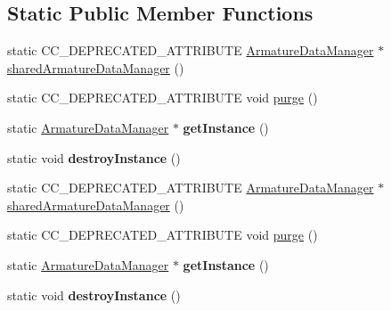 \subsection*{Static Public Member Functions}
\begin{DoxyCompactItemize}
\item 
static C\+C\+\_\+\+D\+E\+P\+R\+E\+C\+A\+T\+E\+D\+\_\+\+A\+T\+T\+R\+I\+B\+U\+TE \hyperlink{classcocostudio_1_1ArmatureDataManager}{Armature\+Data\+Manager} $\ast$ \hyperlink{classcocostudio_1_1ArmatureDataManager_a5f7ba0ce48d07b1aba63a2786c641607}{shared\+Armature\+Data\+Manager} ()
\item 
static C\+C\+\_\+\+D\+E\+P\+R\+E\+C\+A\+T\+E\+D\+\_\+\+A\+T\+T\+R\+I\+B\+U\+TE void \hyperlink{classcocostudio_1_1ArmatureDataManager_a408db55c27dbcaea97edcfed1a4ba66b}{purge} ()
\item 
\mbox{\label{classcocostudio_1_1ArmatureDataManager_a5dc327053e5563d7c4702c012aef62f5}} 
static \hyperlink{classcocostudio_1_1ArmatureDataManager}{Armature\+Data\+Manager} $\ast$ {\bfseries get\+Instance} ()
\item 
\mbox{\label{classcocostudio_1_1ArmatureDataManager_aa226b1e02e1810c7673eea6e0ebe5171}} 
static void {\bfseries destroy\+Instance} ()
\item 
static C\+C\+\_\+\+D\+E\+P\+R\+E\+C\+A\+T\+E\+D\+\_\+\+A\+T\+T\+R\+I\+B\+U\+TE \hyperlink{classcocostudio_1_1ArmatureDataManager}{Armature\+Data\+Manager} $\ast$ \hyperlink{classcocostudio_1_1ArmatureDataManager_a5f7ba0ce48d07b1aba63a2786c641607}{shared\+Armature\+Data\+Manager} ()
\item 
static C\+C\+\_\+\+D\+E\+P\+R\+E\+C\+A\+T\+E\+D\+\_\+\+A\+T\+T\+R\+I\+B\+U\+TE void \hyperlink{classcocostudio_1_1ArmatureDataManager_a408db55c27dbcaea97edcfed1a4ba66b}{purge} ()
\item 
\mbox{\label{classcocostudio_1_1ArmatureDataManager_a10f7fe3e017cd7cba9ff66751068b9ed}} 
static \hyperlink{classcocostudio_1_1ArmatureDataManager}{Armature\+Data\+Manager} $\ast$ {\bfseries get\+Instance} ()
\item 
\mbox{\label{classcocostudio_1_1ArmatureDataManager_af898e796c0bff8de596b84054f736e7f}} 
static void {\bfseries destroy\+Instance} ()
\end{DoxyCompactItemize}
